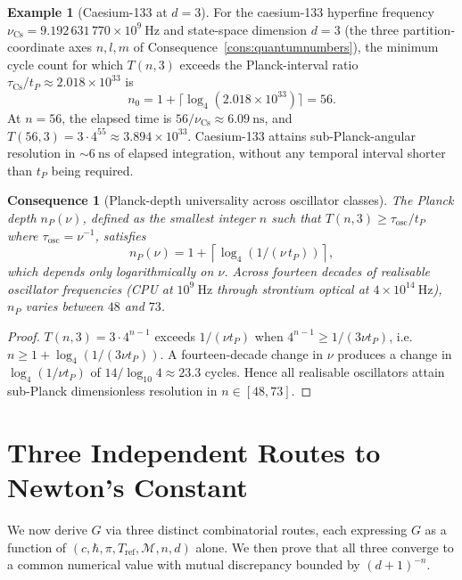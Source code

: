 \documentclass[11pt,twocolumn,a4paper]{article}
\theoremstyle{axiomstyle}
\theoremstyle{conseqstyle}
\newtheorem{consequence}{Consequence}
\theoremstyle{definition}
\newtheorem{example}{Example}
\theoremstyle{remark}
\newcommand{\Depth}{\mathcal{M}}
\begin{document}
\begin{example}[Caesium-133 at $d=3$]\label{ex:caesiumdepth}
For the caesium-133 hyperfine frequency $\nu_{\mathrm{Cs}}=9.192\,631\,770\times10^{9}~\mathrm{Hz}$ and state-space dimension $d=3$ (the three partition-coordinate axes $n,l,m$ of Consequence~\ref{cons:quantumnumbers}), the minimum cycle count for which $T(n,3)$ exceeds the Planck-interval ratio $\tau_{\mathrm{Cs}}/t_{P}\approx2.018\times10^{33}$ is
\begin{equation}
n_{0}=1+\lceil\log_{4}(2.018\times10^{33})\rceil=56.
\end{equation}
At $n=56$, the elapsed time is $56/\nu_{\mathrm{Cs}}\approx 6.09~\mathrm{ns}$, and $T(56,3)=3\cdot 4^{55}\approx 3.894\times10^{33}$. Caesium-133 attains sub-Planck-angular resolution in $\sim 6~\mathrm{ns}$ of elapsed integration, without any temporal interval shorter than $t_{P}$ being required.
\end{example}

\begin{consequence}[Planck-depth universality across oscillator classes]\label{cons:planckdepth}
The Planck depth $n_{P}(\nu)$, defined as the smallest integer $n$ such that $T(n,3)\geq\tau_{\mathrm{osc}}/t_{P}$ where $\tau_{\mathrm{osc}}=\nu^{-1}$, satisfies
\begin{equation}
n_{P}(\nu)=1+\left\lceil\log_{4}(1/(\nu\,t_{P}))\right\rceil,
\end{equation}
which depends only logarithmically on $\nu$. Across fourteen decades of realisable oscillator frequencies (CPU at $10^{9}~\mathrm{Hz}$ through strontium optical at $4\times10^{14}~\mathrm{Hz}$), $n_{P}$ varies between $48$ and $73$.
\end{consequence}

\begin{proof}
$T(n,3)=3\cdot 4^{n-1}$ exceeds $1/(\nu t_{P})$ when $4^{n-1}\geq1/(3\nu t_{P})$, i.e. $n\geq 1+\log_{4}(1/(3\nu t_{P}))$. A fourteen-decade change in $\nu$ produces a change in $\log_{4}(1/\nu t_{P})$ of $14/\log_{10}4\approx 23.3$ cycles. Hence all realisable oscillators attain sub-Planck dimensionless resolution in $n\in[48,73]$.
\end{proof}

\section{Three Independent Routes to Newton's Constant}
\label{sec:threeroutes}

We now derive $G$ via three distinct combinatorial routes, each expressing $G$ as a function of $(c,\hbar,\pi,T_{\mathrm{ref}},\Depth,n,d)$ alone. We then prove that all three converge to a common numerical value with mutual discrepancy bounded by $(d+1)^{-n}$.
\end{document}
